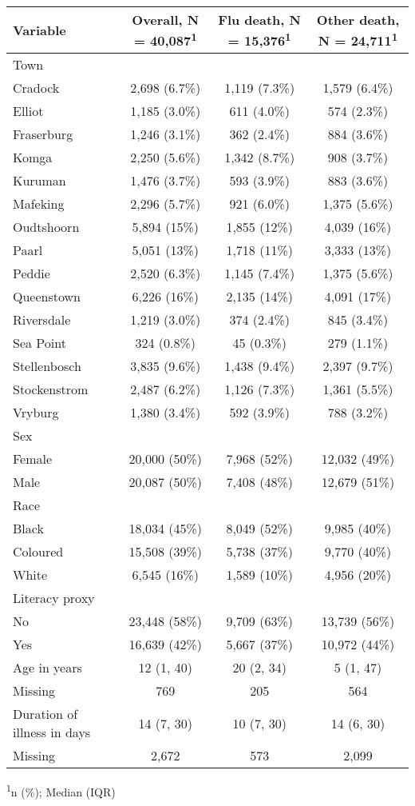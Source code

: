 \captionsetup[table]{labelformat=empty,skip=1pt}
\begin{longtable}{lccc}
\toprule
\textbf{Variable} & \textbf{Overall}, N = 40,087\textsuperscript{1} & \textbf{Flu death}, N = 15,376\textsuperscript{1} & \textbf{Other death}, N = 24,711\textsuperscript{1} \\ 
\midrule
Town &  &  &  \\ 
Cradock & 2,698 (6.7\%) & 1,119 (7.3\%) & 1,579 (6.4\%) \\ 
Elliot & 1,185 (3.0\%) & 611 (4.0\%) & 574 (2.3\%) \\ 
Fraserburg & 1,246 (3.1\%) & 362 (2.4\%) & 884 (3.6\%) \\ 
Komga & 2,250 (5.6\%) & 1,342 (8.7\%) & 908 (3.7\%) \\ 
Kuruman & 1,476 (3.7\%) & 593 (3.9\%) & 883 (3.6\%) \\ 
Mafeking & 2,296 (5.7\%) & 921 (6.0\%) & 1,375 (5.6\%) \\ 
Oudtshoorn & 5,894 (15\%) & 1,855 (12\%) & 4,039 (16\%) \\ 
Paarl & 5,051 (13\%) & 1,718 (11\%) & 3,333 (13\%) \\ 
Peddie & 2,520 (6.3\%) & 1,145 (7.4\%) & 1,375 (5.6\%) \\ 
Queenstown & 6,226 (16\%) & 2,135 (14\%) & 4,091 (17\%) \\ 
Riversdale & 1,219 (3.0\%) & 374 (2.4\%) & 845 (3.4\%) \\ 
Sea Point & 324 (0.8\%) & 45 (0.3\%) & 279 (1.1\%) \\ 
Stellenbosch & 3,835 (9.6\%) & 1,438 (9.4\%) & 2,397 (9.7\%) \\ 
Stockenstrom & 2,487 (6.2\%) & 1,126 (7.3\%) & 1,361 (5.5\%) \\ 
Vryburg & 1,380 (3.4\%) & 592 (3.9\%) & 788 (3.2\%) \\ 
Sex &  &  &  \\ 
Female & 20,000 (50\%) & 7,968 (52\%) & 12,032 (49\%) \\ 
Male & 20,087 (50\%) & 7,408 (48\%) & 12,679 (51\%) \\ 
Race &  &  &  \\ 
Black & 18,034 (45\%) & 8,049 (52\%) & 9,985 (40\%) \\ 
Coloured & 15,508 (39\%) & 5,738 (37\%) & 9,770 (40\%) \\ 
White & 6,545 (16\%) & 1,589 (10\%) & 4,956 (20\%) \\ 
Literacy proxy &  &  &  \\ 
No & 23,448 (58\%) & 9,709 (63\%) & 13,739 (56\%) \\ 
Yes & 16,639 (42\%) & 5,667 (37\%) & 10,972 (44\%) \\ 
Age in years & 12 (1, 40) & 20 (2, 34) & 5 (1, 47) \\ 
Missing & 769 & 205 & 564 \\ 
Duration of illness in days & 14 (7, 30) & 10 (7, 30) & 14 (6, 30) \\ 
Missing & 2,672 & 573 & 2,099 \\ 
 \bottomrule
\end{longtable}
\vspace{-5mm}
\begin{minipage}{\linewidth}
\textsuperscript{1}n (\%); Median (IQR) \\ 
\end{minipage}


